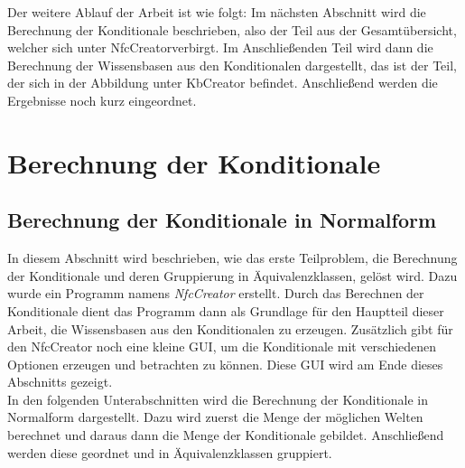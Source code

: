 \documentclass[12pt,a4paper]{article}
\begin{document}
Der weitere Ablauf der Arbeit ist wie folgt: Im nächsten Abschnitt wird die Berechnung der Konditionale beschrieben, also der Teil aus der Gesamtübersicht, welcher sich unter \glqq NfcCreator\grqq \space verbirgt. Im Anschließenden Teil wird dann die Berechnung der Wissensbasen aus den Konditionalen dargestellt, das ist der Teil, der sich in der Abbildung unter \glqq KbCreator \grqq \space befindet. Anschließend werden die Ergebnisse noch kurz eingeordnet.

\section{Berechnung der Konditionale}

\subsection{Berechnung der Konditionale in Normalform}

In diesem Abschnitt wird beschrieben, wie das erste Teilproblem, die Berechnung der Konditionale und deren Gruppierung in Äquivalenzklassen, gelöst wird. Dazu wurde ein Programm namens \textit{NfcCreator} erstellt. Durch das Berechnen der Konditionale dient das Programm dann als Grundlage für den Hauptteil dieser Arbeit, die Wissensbasen aus den Konditionalen zu erzeugen. Zusätzlich gibt für den NfcCreator noch eine kleine GUI, um die Konditionale mit verschiedenen Optionen erzeugen und betrachten zu können. Diese GUI wird am Ende dieses Abschnitts gezeigt. \\
In den folgenden Unterabschnitten wird die Berechnung der Konditionale in Normalform dargestellt. Dazu wird zuerst die Menge der möglichen Welten berechnet und daraus dann die Menge der Konditionale gebildet. Anschließend werden diese geordnet und in Äquivalenzklassen gruppiert.
\end{document}
